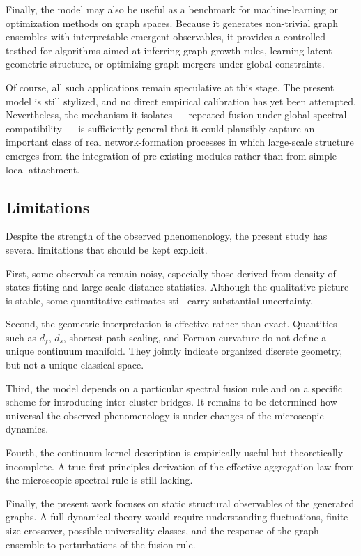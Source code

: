 \documentclass[11pt]{article}
\begin{document}
Finally, the model may also be useful as a benchmark for machine-learning or optimization methods on graph spaces.
Because it generates non-trivial graph ensembles with interpretable emergent observables, it provides a controlled testbed for algorithms aimed at inferring graph growth rules, learning latent geometric structure, or optimizing graph mergers under global constraints.

Of course, all such applications remain speculative at this stage.
The present model is still stylized, and no direct empirical calibration has yet been attempted.
Nevertheless, the mechanism it isolates --- repeated fusion under global spectral compatibility --- is sufficiently general that it could plausibly capture an important class of real network-formation processes in which large-scale structure emerges from the integration of pre-existing modules rather than from simple local attachment.

\subsection{Limitations}

Despite the strength of the observed phenomenology, the present study has several limitations that should be kept explicit.

First, some observables remain noisy, especially those derived from density-of-states fitting and large-scale distance statistics.
Although the qualitative picture is stable, some quantitative estimates still carry substantial uncertainty.

Second, the geometric interpretation is effective rather than exact.
Quantities such as $d_f$, $d_s$, shortest-path scaling, and Forman curvature do not define a unique continuum manifold.
They jointly indicate organized discrete geometry, but not a unique classical space.

Third, the model depends on a particular spectral fusion rule and on a specific scheme for introducing inter-cluster bridges.
It remains to be determined how universal the observed phenomenology is under changes of the microscopic dynamics.

Fourth, the continuum kernel description is empirically useful but theoretically incomplete.
A true first-principles derivation of the effective aggregation law from the microscopic spectral rule is still lacking.

Finally, the present work focuses on static structural observables of the generated graphs.
A full dynamical theory would require understanding fluctuations, finite-size crossover, possible universality classes, and the response of the graph ensemble to perturbations of the fusion rule.
\end{document}
